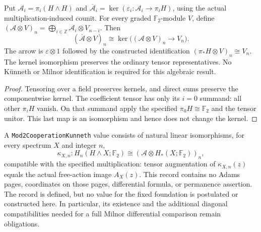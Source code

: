 \begin{proposition}
  \label{prop:h6-graded-tensor-kernel}
  \leanok
  Put $\mathcal A_i=\pi_i(H\wedge H)$ and
  $\overline{\mathcal A}_i=\ker(\varepsilon_i:\mathcal A_i\to\pi_iH)$,
  using the actual multiplication-induced counit. For every graded
  $\mathbb F_2$-module $V$, define
  $(\mathcal A\otimes V)_n=\bigoplus_{i\in\mathbb Z}\mathcal A_i\otimes V_{n-i}$.
  Then
  \[
    (\overline{\mathcal A}\otimes V)_n
      \cong\ker\bigl((\mathcal A\otimes V)_n\longrightarrow V_n\bigr).
  \]
  The arrow is $\varepsilon\otimes 1$ followed by the constructed
  identification $(\pi_*H\otimes V)_n\cong V_n$. The kernel isomorphism
  preserves the ordinary tensor representatives. No K\"unneth or Milnor
  identification is required for this algebraic result.
\end{proposition}
\begin{proof}
  Tensoring over a field preserves kernels, and direct sums preserve the
  componentwise kernel. The coefficient tensor has only its $i=0$ summand:
  all other $\pi_iH$ vanish. On that summand apply the specified
  $\pi_0H\cong\mathbb F_2$ and the tensor unitor. This last map is an
  isomorphism and hence does not change the kernel.
  \leanok
\end{proof}

\begin{definition}
  \label{def:h6-homology-kunneth-input}
  \leanok
  A \texttt{Mod2CooperationKunneth} value consists of natural linear
  isomorphisms, for every spectrum $X$ and integer $n$,
  \[
    \kappa_{X,n}:H_n(H\wedge X;\mathbb F_2)
       \cong(\mathcal A\otimes H_*(X;\mathbb F_2))_n,
  \]
  compatible with the specified multiplication: tensor augmentation of
  $\kappa_{X,n}(z)$ equals the actual free-action image $A_X(z)$.
  This record contains no Adams pages, coordinates on those pages,
  differential formula, or permanence assertion. The record is defined,
  but no value for the fixed foundation is postulated or constructed here.
  In particular, its existence and the additional diagonal compatibilities
  needed for a full Milnor differential comparison remain obligations.
\end{definition}

